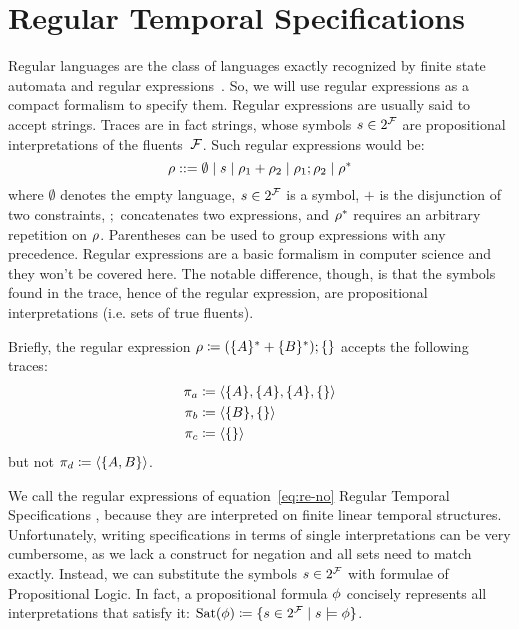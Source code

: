 \section{Regular Temporal Specifications}

Regular languages are the class of languages exactly recognized by finite
state automata and regular expressions~\cite{bib:languages-book}. So, we will
use regular expressions as a compact formalism to specify them. Regular
expressions are usually said to accept strings. Traces are in fact strings,
whose symbols $s \in 2^{\mathcal{F}}$ are propositional interpretations of the
fluents~$\mathcal{F}$. Such regular expressions would be:
\begin{equation}
	\rho ::= \emptyset \mid s \mid
	\rho_1 + \rho_2 \mid \rho_1 ; \rho_2 \mid \rho^*
	\label{eq:re-no}
\end{equation}
where $\emptyset$ denotes the empty language, $s \in 2^{\mathcal{F}}$ is a symbol,
$+$ is the disjunction of two constraints, $;$ concatenates two
expressions, and $\rho^*$ requires an arbitrary repetition on $\rho$.
Parentheses can be used to group expressions with any precedence.
Regular expressions are a basic formalism in computer science and they won't
be covered here. The notable difference, though, is that the symbols found in
the trace, hence of the regular expression, are propositional interpretations
(i.e. sets of true fluents).

\begin{example}
	Briefly, the regular expression $\rho \coloneqq (\{A\}^* + \{B\}^*) ;
	\{\}$ accepts the following traces:
	\begin{align*}
		\pi_a &\coloneqq \langle \{A\}, \{A\}, \{A\}, \{\} \rangle \\
		\pi_b &\coloneqq \langle \{B\}, \{\} \rangle \\
		\pi_c &\coloneqq \langle \{\} \rangle \\
	\end{align*}
	but not $\pi_d \coloneqq \langle \{A, B\} \rangle$.
\end{example}

We call the regular expressions of equation~\eqref{eq:re-no} Regular Temporal
Specifications \re{}, because they are interpreted on finite linear temporal
structures. Unfortunately, writing specifications in terms of single
interpretations can be very cumbersome, as we lack a construct for negation
and all sets need to match exactly. Instead, we can substitute the symbols $s
\in 2^{\mathcal{F}}$ with formulae of Propositional Logic. In fact, a propositional
formula $\phi$ concisely represents all interpretations that satisfy
it: $\text{Sat}(\phi) \coloneqq \{s \in 2^{\mathcal{F}} \mid s \models
\phi\}$.


